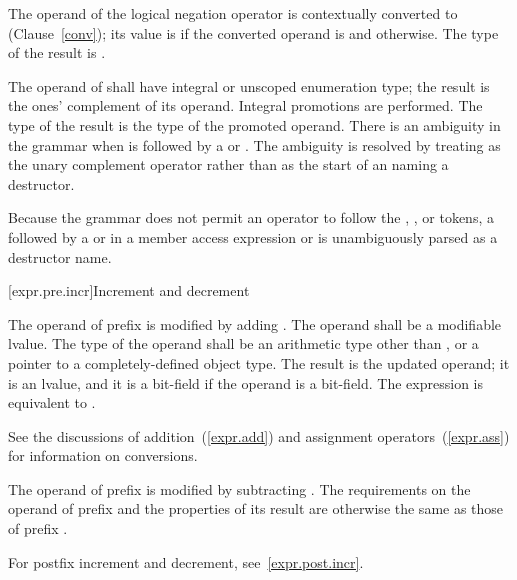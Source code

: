 \pnum
{}%
The operand of the logical negation operator \tcode{!} is contextually
converted to 
(Clause~\ref{conv}); its value is 
if the converted operand is  and  otherwise.
The type of the result is .

\pnum
{}%
%
The operand of \tcode{\~{}} shall have integral or unscoped enumeration type; the
result is the ones' complement of its operand. Integral promotions are
performed. The type of the result is the type of the promoted operand.
There is an ambiguity
in the grammar when \tcode{\~{}} is followed by
a  or .
The ambiguity is resolved by treating \tcode{\~{}} as the unary complement
operator rather than as the start of an 
naming a destructor.
\begin{note}
Because the grammar does not permit an operator to follow the
, \tcode{->}, or \tcode{::} tokens, a \tcode{\~{}} followed by
a  or  in a
member access expression or  is
unambiguously parsed as a destructor name.
\end{note}

[expr.pre.incr]{Increment and decrement}

\pnum
{}%
%
The operand of prefix \tcode{++}
%
%
is modified by adding .
%
The operand shall be a modifiable lvalue. The type of the operand shall
be an arithmetic type other than \cv{} ,
or a pointer to a completely-defined object type.
The result is the updated operand; it is an lvalue, and it is a
bit-field if the operand is a bit-field.
The expression  is equivalent to .
%
\begin{note}
See the discussions of addition~(\ref{expr.add}) and assignment
operators~(\ref{expr.ass}) for information on conversions.
\end{note}

\pnum
The operand of prefix
%
\tcode{\dcr} is modified by subtracting .
The requirements on the operand of prefix
\tcode{\dcr} and the properties of its result are otherwise the same as
those of prefix \tcode{++}.
\begin{note}
For postfix increment and decrement, see~\ref{expr.post.incr}.
\end{note}

